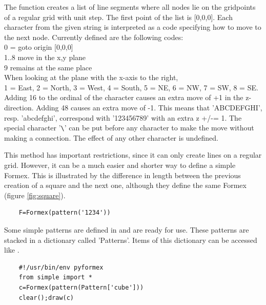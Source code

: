 The function  creates a list of line segments where all nodes lie on the
gridpoints of a regular grid with unit step.
The first point of the list is [0,0,0]. Each character from the given
string  is interpreted as a code specifying how to move to the next node.
Currently defined are the following codes:\\
    0 = goto origin [0,0,0]\\
    1..8 move in the x,y plane\\
    9 remains at the same place\\
    When looking at the plane with the x-axis to the right,\\
    1 = East, 2 = North, 3 = West, 4 = South, 5 = NE, 6 = NW, 7 = SW, 8 = SE.\\
    Adding 16 to the ordinal of the character causes an extra move of +1 in
    the z-direction. Adding 48 causes an extra move of -1. This means that
    'ABCDEFGHI', resp. 'abcdefghi', correspond with '123456789' with an extra
    z +/-= 1.              
    The special character '\verb?\?' can be put before any character to make the
    move without making a connection.
    The effect of any other character is undefined.

This method has important restrictions, since it can only create lines on a regular grid. However, it can be a much easier and shorter way to define a simple Formex. This is illustrated by the difference in length between the previous creation of a square and the next one, although they define the same Formex (figure \ref{fig:square}).
\begin{verbatim}
	F=Formex(pattern('1234'))
\end{verbatim}

Some simple patterns are defined in  and are ready for use. These patterns are stacked in a dictionary called 'Patterns'. Items of this dictionary can be accessed like .
\begin{verbatim}
	#!/usr/bin/env pyformex
	from simple import *
	c=Formex(pattern(Pattern['cube']))
	clear();draw(c)
\end{verbatim}

